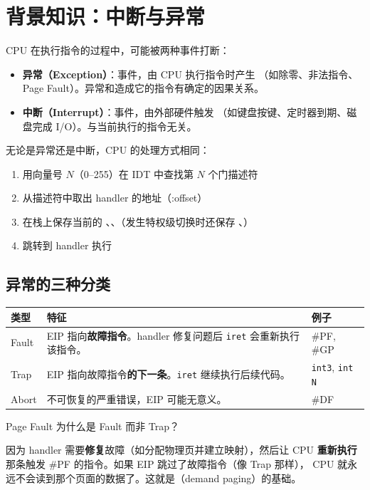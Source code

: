 \section{背景知识：中断与异常}

CPU 在执行指令的过程中，可能被两种事件打断：

\begin{itemize}
  \item \textbf{异常（Exception）}：事件，由 CPU 执行指令时产生
    （如除零、非法指令、Page Fault）。异常和造成它的指令有确定的因果关系。
  \item \textbf{中断（Interrupt）}：事件，由外部硬件触发
    （如键盘按键、定时器到期、磁盘完成 I/O）。与当前执行的指令无关。
\end{itemize}

无论是异常还是中断，CPU 的处理方式相同：
\begin{enumerate}
  \item 用向量号 $N$（0--255）在 IDT 中查找第 $N$ 个门描述符
  \item 从描述符中取出 handler 的地址（:offset）
  \item 在栈上保存当前的 、、（发生特权级切换时还保存 、）
  \item 跳转到 handler 执行
\end{enumerate}

\subsection{异常的三种分类}

\begin{longtable}{l p{7.5cm} l}
  \toprule
  \textbf{类型} & \textbf{特征} & \textbf{例子} \\
  \midrule
  Fault  & EIP 指向\textbf{故障指令}。handler 修复问题后 \texttt{iret} 会重新执行该指令。
         & \#PF, \#GP \\
  Trap   & EIP 指向故障指令\textbf{的下一条}。\texttt{iret} 继续执行后续代码。
         & \texttt{int3}, \texttt{int N} \\
  Abort  & 不可恢复的严重错误，EIP 可能无意义。
         & \#DF \\
  \bottomrule
\end{longtable}

\begin{thinkbox}
Page Fault 为什么是 Fault 而非 Trap？

因为 handler 需要\textbf{修复}故障（如分配物理页并建立映射），然后让 CPU
\textbf{重新执行}那条触发 \#PF 的指令。如果 EIP 跳过了故障指令（像 Trap 那样），
CPU 就永远不会读到那个页面的数据了。这就是（demand paging）的基础。
\end{thinkbox}

